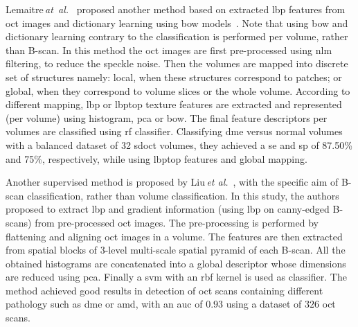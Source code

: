 Lemaitre\,\textit{at~al.}~\cite{Lemaintre2015miccaiOCT} proposed another method based on extracted \gls{lbp} features from \gls{oct} images and dictionary learning using \gls{bow} models~\cite{Sivic2003}. 
Note that using \gls{bow} and dictionary learning contrary to \cite{Srinivasan2014} the classification is performed per volume, rather than B-scan. 
In this method the \gls{oct} images are first pre-processed using \gls{nlm} filtering, to reduce the speckle noise. 
Then the volumes are mapped into discrete set of structures namely: local, when these structures correspond to patches; or global, when they correspond to volume slices or the whole volume.
According to different mapping, \gls{lbp} or \gls{lbptop} texture features are extracted and represented (per volume) using histogram, \gls{pca} or \gls{bow}. 
The final feature descriptors per volumes are classified using \gls{rf} classifier.
Classifying \gls{dme} versus normal volumes with a balanced dataset of 32 \gls{sdoct} volumes, they achieved a \gls{se} and \gls{sp} of 87.50\% and 75\%, respectively, while using \gls{lbptop} features and global mapping.

Another supervised method is proposed by Liu\,\textit{et al.}~\cite{Liu2011}, with the specific aim of B-scan classification, rather than volume classification. 
In this study, the authors proposed to extract \gls{lbp} and gradient information (using \gls{lbp} on canny-edged B-scans) from pre-processed \gls{oct} images. 
The pre-processing is performed by flattening and aligning \gls{oct} images in a volume.
The features are then extracted from spatial blocks of $3$-level multi-scale spatial pyramid of each B-scan.
All the obtained histograms are concatenated into a global descriptor whose dimensions are reduced using \gls{pca}.
Finally a \gls{svm} with an \gls{rbf} kernel is used as classifier.
The method achieved good results in detection of \gls{oct} scans containing different pathology such as \gls{dme} or \gls{amd}, with an \gls{auc} of $0.93$ using a dataset of $326$ \gls{oct} scans.


